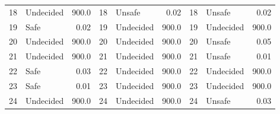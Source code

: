 \begin{table}[!ht]
\begin{tabular}{|llr|llr|llr|}
    18 & Undecided & 900.0 &    18 & Unsafe & 0.02 &    18 & Unsafe & 0.02\\ 
    19 & Safe & 0.02 &    19 & Undecided & 900.0 &    19 & Undecided & 900.0\\ 
    20 & Undecided & 900.0 &    20 & Undecided & 900.0 &    20 & Unsafe & 0.05\\ 
    21 & Undecided & 900.0 &    21 & Undecided & 900.0 &    21 & Unsafe & 0.01\\ 
    22 & Safe & 0.03 &    22 & Undecided & 900.0 &    22 & Undecided & 900.0\\ 
    23 & Safe & 0.01 &    23 & Undecided & 900.0 &    23 & Undecided & 900.0\\ 
    24 & Undecided & 900.0 &    24 & Undecided & 900.0 &    24 & Unsafe & 0.03\\ 
    \bottomrule
  \end{tabular}
\end{table}


